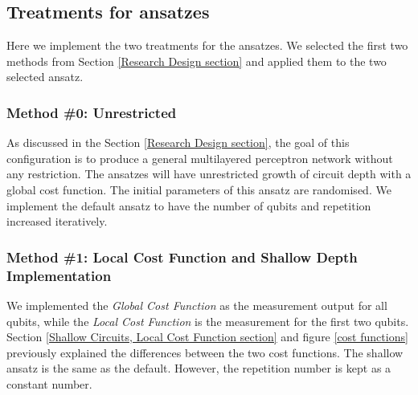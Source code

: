 \subsection{Treatments for ansatzes}
Here we implement the two treatments for the ansatzes.
We selected the first two methods from Section \ref{Research Design section} and applied them to the two selected ansatz.

\subsubsection{Method \#0: Unrestricted}
As discussed in the Section \ref{Research Design section}, the goal of this configuration is to produce a general multilayered perceptron network without any restriction.
The ansatzes will have unrestricted growth of circuit depth with a global cost function. 
The initial parameters of this ansatz are randomised.
We implement the default ansatz to have the number of qubits and repetition increased iteratively.

\subsubsection{Method \#1: Local Cost Function and Shallow Depth Implementation}
We implemented the \textit{Global Cost Function} as the measurement output for all qubits, while the \textit{Local Cost Function} is the measurement for the first two qubits.
Section \ref{Shallow Circuits, Local Cost Function section} and figure \ref{cost functions} previously explained the differences between the two cost functions.
The shallow ansatz is the same as the default. 
However, the repetition number is kept as a constant number.